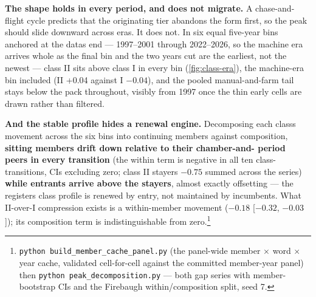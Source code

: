 \textbf{The shape holds in every period, and does not migrate.} A chase-and-flight
cycle predicts that the originating tier abandons the form first, so the peak
should slide downward across eras. It does not. In six equal five-year bins
anchored at the data\textquotesingle s end --- 1997--2001 through 2022--2026, so the machine era
arrives whole as the final bin and the two years cut are the earliest, not
the newest --- class II sits above class I in every bin (\cref{fig:class-era}), the machine-era bin
included (II +0.04 against I \(-0.04\)), and the pooled manual-and-farm tail
stays below the pack throughout, visibly from 1997 once the thin early cells
are drawn rather than filtered.

\textbf{And the stable profile hides a renewal engine.} Decomposing each
class\textquotesingle s movement across the six bins into continuing members against
composition, \textbf{sitting members drift down relative to their chamber-and-
period peers in every transition} (the within term is negative in all ten
class-transitions, CIs excluding zero; class II stayers \(-0.75\) summed
across the series) \textbf{while entrants arrive above the stayers}, almost
exactly offsetting --- the register\textquotesingle s class profile is renewed by entry, not
maintained by incumbents. What II-over-I compression exists is a
within-member movement (\(-0.18\) {[}\(-0.32\), \(-0.03\){]}); its composition term is
indistinguishable from zero.\footnote{\texttt{python\ build\_\allowbreak{}member\_\allowbreak{}cache\_\allowbreak{}panel.\allowbreak{}py} (the panel-wide member \(\times\)
  word \(\times\) year cache, validated cell-for-cell against the committed
  member-year panel) then \texttt{python\ peak\_\allowbreak{}decomposition.\allowbreak{}py} --- both gap
  series with member-bootstrap CIs and the Firebaugh within/composition
  split, seed 7.}

